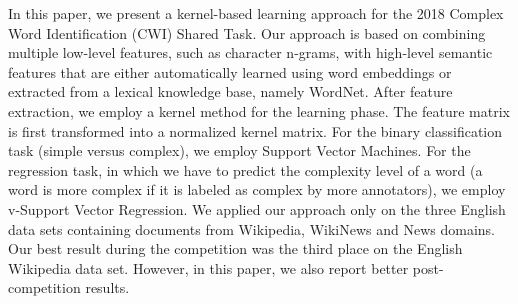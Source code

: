 In this paper, we present a kernel-based learning approach for the 2018 Complex Word Identification (CWI) Shared Task. Our approach is based on combining multiple low-level features, such as character n-grams, with high-level semantic features that are either automatically learned using word embeddings or extracted from a lexical knowledge base, namely WordNet. After feature extraction, we employ a kernel method for the learning phase. The feature matrix is first transformed into a normalized kernel matrix. For the binary classification task (simple versus complex), we employ Support Vector Machines. For the regression task, in which we have to predict the complexity level of a word (a word is more complex if it is labeled as complex by more annotators), we employ v-Support Vector Regression. We applied our approach only on the three English data sets containing documents from Wikipedia, WikiNews and News domains. Our best result during the competition was the third place on the English Wikipedia data set. However, in this paper, we also report better post-competition results.
